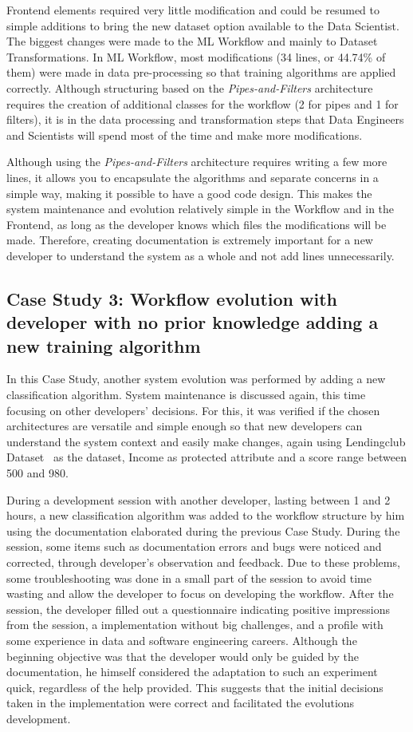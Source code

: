 \documentclass[10pt,conference]{IEEEtran}
\begin{document}
Frontend elements required very little modification and could be resumed to simple additions to bring the new dataset option available to the Data Scientist. The biggest changes were made to the ML Workflow and mainly to Dataset Transformations. In ML Workflow, most modifications (34 lines, or 44.74\% of them) were made in data pre-processing so that training algorithms are applied correctly. Although structuring based on the \textit{Pipes-and-Filters} architecture requires the creation of additional classes for the workflow (2 for pipes and 1 for filters), it is in the data processing and transformation steps that Data Engineers and Scientists will spend most of the time and make more modifications.

Although using the \textit{Pipes-and-Filters} architecture requires writing a few more lines, it allows you to encapsulate the algorithms and separate concerns in a simple way, making it possible to have a good code design. This makes the system maintenance and evolution relatively simple in the Workflow and in the Frontend, as long as the developer knows which files the modifications will be made. Therefore, creating documentation is extremely important for a new developer to understand the system as a whole and not add lines unnecessarily.

\subsection{Case Study 3: Workflow evolution with developer with no prior knowledge adding a new training algorithm}

In this Case Study, another system evolution was performed by adding a new classification algorithm. System maintenance is discussed again, this time focusing on other developers' decisions. For this, it was verified if the chosen architectures are versatile and simple enough so that new developers can understand the system context and easily make changes, again using Lendingclub Dataset~\citep{lendingclub_2022} as the dataset, Income as protected attribute and a score range between 500 and 980.

During a development session with another developer, lasting between 1 and 2 hours, a new classification algorithm was added to the workflow structure by him using the documentation elaborated during the previous Case Study. During the session, some items such as documentation errors and bugs were noticed and corrected, through developer's observation and feedback. Due to these problems, some troubleshooting was done in a small part of the session to avoid time wasting and allow the developer to focus on developing the workflow. After the session, the developer filled out a questionnaire indicating positive impressions from the session, a implementation without big challenges, and a profile with some experience in data and software engineering careers. Although the beginning objective was that the developer would only be guided by the documentation, he himself considered the adaptation to such an experiment quick, regardless of the help provided. This suggests that the initial decisions taken in the implementation were correct and facilitated the evolutions development.
\end{document}
